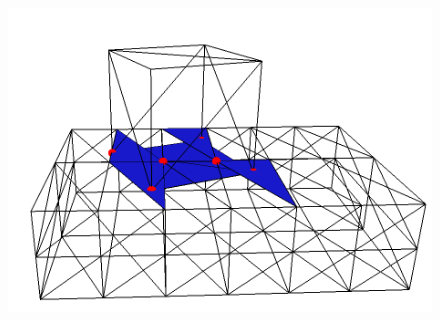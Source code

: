 \begin{figure}[tbp]
\begin{minipage}[b]{0.3 \linewidth}
{		       \includegraphics[width=1.0\linewidth]{pics/png/redef_vf03.png} }
			\end{minipage}\\
			

\end{figure}
